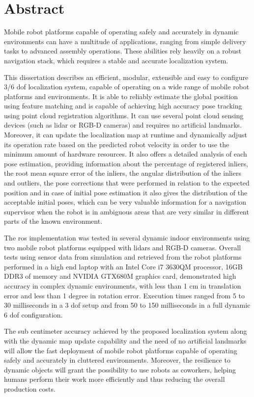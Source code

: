 \chapter*{Abstract}

Mobile robot platforms capable of operating safely and accurately in dynamic environments can have a multitude of applications, ranging from simple delivery tasks to advanced assembly operations. These abilities rely heavily on a robust navigation stack, which requires a stable and accurate localization system.

This dissertation describes an efficient, modular, extensible and easy to configure 3/6 \gls{dof} localization system, capable of operating on a wide range of mobile robot platforms and environments. It is able to reliably estimate the global position using feature matching and is capable of achieving high accuracy pose tracking using point cloud registration algorithms. It can use several point cloud sensing devices (such as \gls{lidar} or RGB-D cameras) and requires no artificial landmarks. Moreover, it can update the localization map at runtime and dynamically adjust its operation rate based on the predicted robot velocity in order to use the minimum amount of hardware resources. It also offers a detailed analysis of each pose estimation, providing information about the percentage of registered inliers, the root mean square error of the inliers, the angular distribution of the inliers and outliers, the pose corrections that were performed in relation to the expected position and in case of initial pose estimation it also gives the distribution of the acceptable initial poses, which can be very valuable information for a navigation supervisor when the robot is in ambiguous areas that are very similar in different parts of the known environment.

The \gls{ros} implementation was tested in several dynamic indoor environments using two mobile robot platforms equipped with \glspl{lidar} and RGB-D cameras. Overall tests using sensor data from simulation and retrieved from the robot platforms performed in a high end laptop with an Intel Core i7 3630QM processor, 16GB DDR3 of memory and NVIDIA GTX680M graphics card, demonstrated high accuracy in complex dynamic environments, with less than 1 cm in translation error and less than 1 degree in rotation error. Execution times ranged from 5 to 30 milliseconds in a 3 \gls{dof} setup and from 50 to 150 milliseconds in a full dynamic 6 \gls{dof} configuration.

The sub centimeter accuracy achieved by the proposed localization system along with the dynamic map update capability and the need of no artificial landmarks will allow the fast deployment of mobile robot platforms capable of operating safely and accurately in cluttered environments. Moreover, the resilience to dynamic objects will grant the possibility to use robots as coworkers, helping humans perform their work more efficiently and thus reducing the overall production costs.




